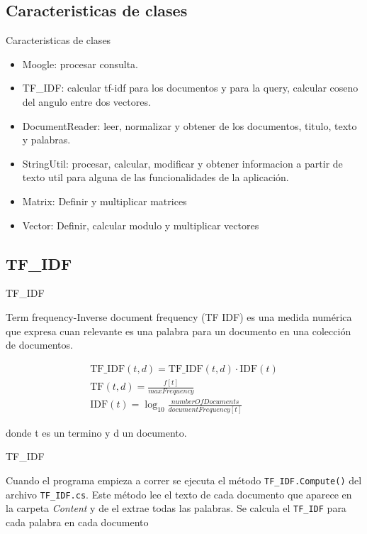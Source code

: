 \documentclass[11pt]{beamer}
\begin{document}
\subsection{Caracteristicas de clases}

\begin{frame}{Caracteristicas de clases}
    
    \begin{itemize}
        \item Moogle: procesar consulta.
        \item TF\_IDF: calcular tf-idf para los documentos y para la query, calcular coseno del angulo entre dos vectores.
        \item DocumentReader: leer, normalizar y obtener de los documentos, titulo, texto y palabras.
        \item StringUtil: procesar, calcular, modificar y obtener informacion a partir de texto util para alguna de las funcionalidades de la aplicación.
        \item Matrix: Definir y multiplicar matrices
        \item Vector: Definir, calcular modulo y multiplicar vectores
    \end{itemize}
    
\end{frame}

\subsection{TF\_IDF}

\begin{frame}{TF\_IDF}

Term frequency-Inverse document frequency (TF IDF) es una medida numérica que expresa
cuan relevante es una palabra para un documento en una colección de documentos.

\begin{eqnarray*}
    \mathrm{TF\_IDF}(t,d) = \mathrm{TF\_IDF}(t,d) \cdot \mathrm{IDF}(t) \\
    \mathrm{TF}(t,d) = \frac{f[t]}{maxFrequency} \\
    \mathrm{IDF}(t) = \log_{10}{\frac{numberOfDocuments}{documentFrequency[t]}}
\end{eqnarray*}

donde t es un termino y d un documento.

\end{frame}

\begin{frame}{TF\_IDF}

Cuando el programa empieza a correr se ejecuta el método \texttt{TF\_IDF.Compute()} del archivo
\texttt{TF\_IDF.cs}. Este método lee el texto de cada documento que aparece en la carpeta \emph{Content} y de el
extrae todas las palabras. Se calcula el \texttt{TF\_IDF} para cada palabra en cada documento

\end{frame}
\end{document}
